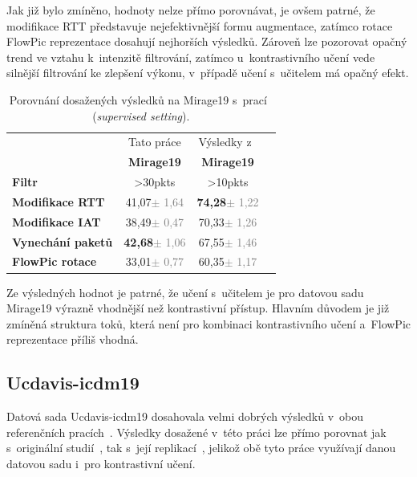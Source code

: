 Jak již bylo zmíněno, hodnoty nelze přímo porovnávat, je ovšem patrné, že modifikace RTT představuje nejefektivnější formu augmentace, zatímco rotace FlowPic reprezentace dosahují nejhorších výsledků. Zároveň lze pozorovat opačný trend ve vztahu k~intenzitě filtrování, zatímco u~kontrastivního učení vede silnější filtrování ke zlepšení výkonu, v~případě učení s~učitelem má opačný efekt.

\begin{table}[H]
    \centering
    \begin{tabular}{lccc}
        \toprule
         & Tato práce & Výsledky z~\cite{huawei_paper}\\
          & \textbf{Mirage19} & \textbf{Mirage19} \\
         \textbf{Filtr} & >30pkts & >10pkts \\
        \midrule
        \textbf{Modifikace RTT} & 41,07{\tiny\textcolor{gray}{$\pm$ 1,64}} & \textbf{74,28}{\tiny\textcolor{gray}{$\pm$ 1,22}} \\
        \textbf{Modifikace IAT} & 38,49{\tiny\textcolor{gray}{$\pm$ 0,47}} & 70,33{\tiny\textcolor{gray}{$\pm$ 1,26}} \\
        \textbf{Vynechání paketů} & \textbf{42,68}{\tiny\textcolor{gray}{$\pm$ 1,06}} & 67,55{\tiny\textcolor{gray}{$\pm$ 1,46}} \\
        \textbf{FlowPic rotace} & 33,01{\tiny\textcolor{gray}{$\pm$ 0,77}} & 60,35{\tiny\textcolor{gray}{$\pm$ 1,17}} \\
        \bottomrule
    \end{tabular}
    \caption{Porovnání dosažených výsledků na Mirage19 s~prací~\cite{huawei_paper} (\textit{supervised setting}).}
\end{table}

Ze výsledných hodnot je patrné, že učení s~učitelem je pro datovou sadu Mirage19 výrazně vhodnější než kontrastivní přístup. Hlavním důvodem je již zmíněná struktura toků, která není pro kombinaci kontrastivního učení a~FlowPic reprezentace příliš vhodná.

\subsection{Ucdavis-icdm19}
\label{ucdavis_results}
Datová sada Ucdavis-icdm19 dosahovala velmi dobrých výsledků v~obou referenčních pracích~\cite{flowpic_augmentations, huawei_paper}. Výsledky dosažené v~této práci lze přímo porovnat jak s~originální studií~\cite{flowpic_augmentations}, tak s~její replikací~\cite{huawei_paper}, jelikož obě tyto práce využívají danou datovou sadu i~pro kontrastivní učení.

